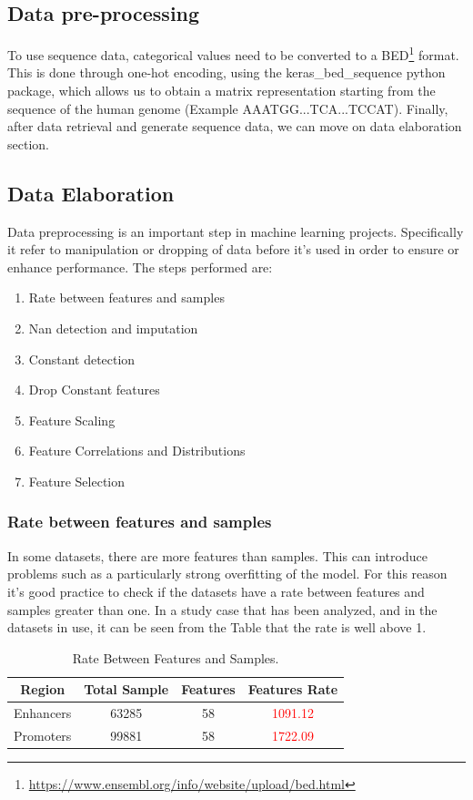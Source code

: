 \documentclass{article}
\begin{document}
\subsection{Data pre-processing}
\label{sec:Data_Pre_Processing}
To use sequence data, categorical values need to be converted to a BED\footnote{\url{https://www.ensembl.org/info/website/upload/bed.html}} format. This is done through one-hot encoding,
using the keras\_bed\_sequence python package, which allows us to obtain a matrix representation starting from the sequence of the human genome (Example AAATGG...TCA...TCCAT).
Finally, after data retrieval and generate sequence data, we can move on data elaboration section.

\subsection{Data Elaboration}
\label{sec:Data_Elaboration}
Data preprocessing is an important step in machine learning projects. Specifically it refer to manipulation or dropping of data before it's used in order to ensure or enhance performance. The steps performed are:
\begin{enumerate}
    \item Rate between features and samples
    \item Nan detection and imputation
    \item Constant detection
    \item Drop Constant features
    \item Feature Scaling
    \item Feature Correlations and Distributions
    \item Feature Selection
\end{enumerate}

\subsubsection{Rate between features and samples}
\label{subsec:Rate_between_features_and_samples}
In some datasets, there are more features than samples. This can introduce problems such as a particularly strong overfitting of the model. For this reason it's good practice to check if the datasets have a rate between features and samples greater than one. In a study case that has been analyzed, and in the datasets in use, it can be seen from the Table that the rate is well above 1.

\begin{table}[!ht]
\begin{center}
\begin{tabular}{ | c | c | c | c |}
\hline
Region & Total Sample & Features & Features Rate \\
\hline
Enhancers & 63285 & 58 & \textcolor{red}{1091.12} \\
\hline
Promoters & 99881 & 58 & \textcolor{red}{1722.09} \\
\hline
\end{tabular}
\caption{\label{tab:features_samples_rate} Rate Between Features and Samples.}
\end{center}
\end{table}
\end{document}
